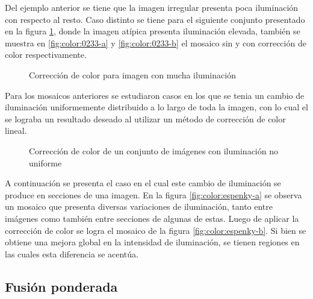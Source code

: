 Del ejemplo anterior se tiene que la imagen irregular presenta poca iluminación con respecto al resto. Caso distinto se tiene para el siguiente conjunto presentado en la figura \ref{imagen:color:0233}, donde la imagen atípica presenta iluminación elevada, también se muestra en \ref{fig:color:0233-a} y \ref{fig:color:0233-b} el mosaico sin y con corrección de color respectivamente. 

\begin{figure}[h]
	\centering     %
	
	\caption[Resultado de corrección de color]{Corrección de color para imagen con mucha iluminación}
	\label{imagen:color:0233}
\end{figure}

Para los mosaicos anteriores se estudiaron casos en los que se tenia un cambio de iluminación uniformemente distribuido a lo largo de toda la imagen, con lo cual el se lograba un resultado deseado al utilizar un método de corrección de color lineal.

\begin{figure}[H]
	\centering     %
	
	\caption[Resultado de corrección de color: \textit{Espenky}]{Corrección de color de un conjunto de imágenes con iluminación no uniforme}
	\label{imagen:color:espenky}
\end{figure}

A continuación se presenta el caso en el cual este cambio de iluminación se produce en secciones de una imagen. En la figura \ref{fig:color:espenky-a} se observa un mosaico que presenta diversas variaciones de iluminación, tanto entre imágenes como también entre secciones de algunas de estas. Luego de aplicar la corrección de color se logra el mosaico de la figura \ref{fig:color:espenky-b}. Si bien se obtiene una mejora global en la intensidad de iluminación, se tienen regiones en las cuales esta diferencia se acentúa.



\subsection*{Fusión ponderada}

